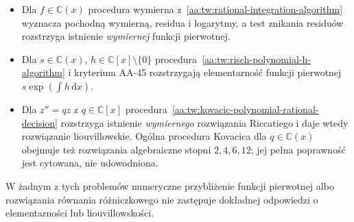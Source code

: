 \begin{itemize}
\item Dla $f\in\mathbb C(x)$
procedura wymierna
z~\ref{aa:tw:rational-integration-algorithm}
wyznacza pochodną wymierną,
residua i logarytmy, a
test znikania residuów
rozstrzyga istnienie
\emph{wymiernej} funkcji pierwotnej.
\item Dla $s\in\mathbb C(x)$,
$h\in\mathbb C[x]\setminus\{0\}$
procedura~\ref{aa:tw:risch-polynomial-h-algorithm}
i kryterium AA-45
rozstrzygają elementarność
funkcji pierwotnej
$s\exp(\int h\,\mathrm dx)$.
\item Dla $z''=qz$ z
$q\in\mathbb C[x]$
procedura~\ref{aa:tw:kovacic-polynomial-rational-decision}
rozstrzyga istnienie
\emph{wymiernego} rozwiązania
Riccatiego i daje wtedy
rozwiązanie liouvillowskie.
Ogólna procedura Kovacica
dla $q\in\mathbb C(x)$
obejmuje też rozwiązania
algebraiczne stopni
$2,4,6,12$; jej pełna
poprawność jest cytowana,
nie udowodniona.
\end{itemize}

W żadnym z tych problemów
numeryczne przybliżenie
funkcji pierwotnej albo
rozwiązania równania
różniczkowego nie zastępuje
dokładnej odpowiedzi o
elementarności lub
liouvillowskości.
